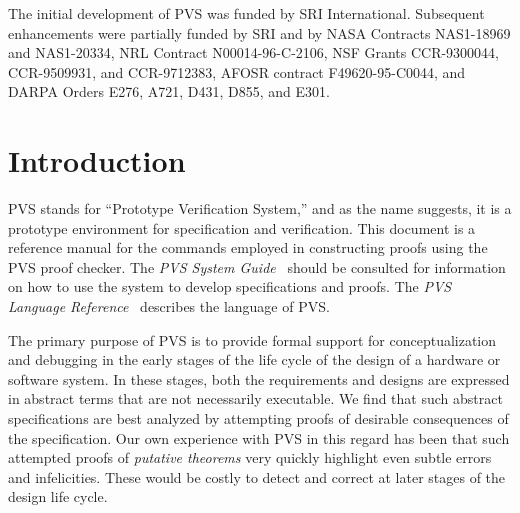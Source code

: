 \documentclass[12pt,twoside]{book}
\begin{document}
\pagestyle{fancy}
\renewcommand{\chaptermark}[1]{\markboth{\emph{#1}}{}\markright{\emph{#1}}}
\renewcommand{\sectionmark}[1]{\markright{\thesection \em \ #1}}
\lhead[\thepage]{\rightmark}
\cfoot{}
\rhead[\leftmark]{\thepage}
\setcounter{secnumdepth}{1} 
\setcounter{tocdepth}{2}
\thispagestyle{empty}

\newpage

\vspace*{6in}\noindent
The initial development of PVS was funded by SRI International.
Subsequent enhancements were partially funded by SRI and by NASA
Contracts NAS1-18969 and NAS1-20334, NRL Contract N00014-96-C-2106,
NSF Grants CCR-9300044, CCR-9509931, and CCR-9712383, AFOSR contract
F49620-95-C0044, and DARPA Orders E276, A721, D431, D855, and E301.
\newpage\setcounter{page}{1}

\tableofcontents
\cleardoublepage
{}
\setcounter{page}{1}

\chapter{Introduction}

PVS stands for ``Prototype Verification System,'' and as the name suggests,
it is a prototype environment for specification and verification.  This document is a
reference manual for the commands employed in constructing proofs using the
PVS proof checker.  The \emph{PVS System Guide}~\cite{PVS:userguide} should
be consulted for information on how to use the system to develop
specifications and proofs.  The \emph{PVS Language
Reference}~\cite{PVS:language} describes the language of PVS\@. 

The primary purpose of PVS is to provide formal support for
conceptualization and debugging in the early stages of the life cycle of
the design of a hardware or software system.  In these stages, both the
requirements and designs are expressed in abstract terms that are not
necessarily executable.  We find that such abstract specifications are
best analyzed by attempting proofs of desirable consequences of the
specification.  Our own experience with PVS in this regard has been that
such attempted proofs of \emph{putative theorems}
very quickly highlight even subtle errors and infelicities.  These would
be costly to detect and correct at later stages of the design life cycle.
\end{document}
